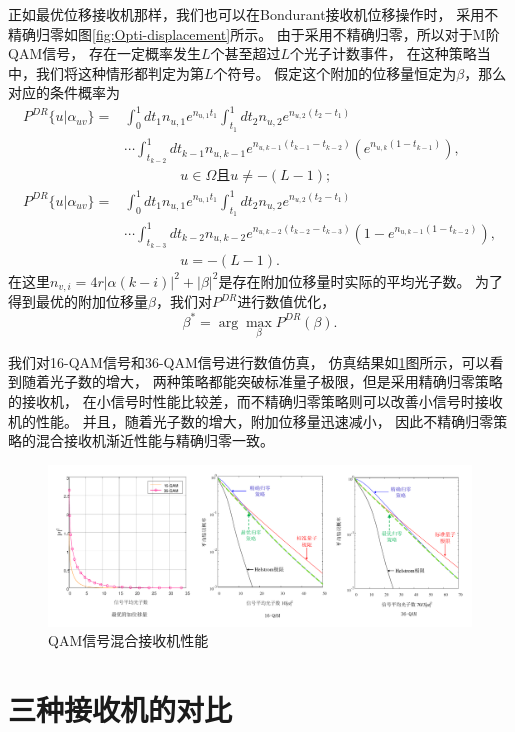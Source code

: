 正如最优位移接收机那样，我们也可以在Bondurant接收机位移操作时，
采用不精确归零如图\ref{fig:Opti-displacement}所示。
由于采用不精确归零，所以对于M阶QAM信号，
存在一定概率发生$L$个甚至超过$L$个光子计数事件，
在这种策略当中，我们将这种情形都判定为第$L$个符号。
假定这个附加的位移量恒定为$\beta$，那么对应的条件概率为
\begin{equation}
\begin{split}
P^{DR}\{u|\alpha_{uv}\} = & \int_0^1 dt_1 n_{u,1} e^{n_{u,1} t_1} \int_{t_1}^1 dt_2 n_{u,2} e^{n_{u,2} (t_2-t_1)} \\
                          & \cdots \int_{t_{k-2}}^1 dt_{k-1} n_{u,k-1} e^{n_{u,k-1} (t_{k-1}-t_{k-2})} \left( e^{n_{u,k} (1-t_{k-1})}\right), \\
                          & \qquad \qquad u \in \Omega \text{且} u \neq -(L-1);   \\
P^{DR}\{u|\alpha_{uv}\} = & \int_0^1 dt_1 n_{u,1} e^{n_{u,1} t_1} \int_{t_1}^1 dt_2 n_{u,2} e^{n_{u,2} (t_2-t_1)} \\
                          & \cdots \int_{t_{k-3}}^1 dt_{k-2} n_{u,k-2} e^{n_{u,k-2} (t_{k-2}-t_{k-3})} \left( 1 - e^{n_{u,k-1} (1-t_{k-2})}\right),  \\
                          & \qquad \qquad u = -(L-1).
\end{split}
\label{eq:DR-cond-p-2}
\end{equation}
在这里$n_{v,i} = 4r|\alpha(k-i)|^2 + |\beta|^2$是存在附加位移量时实际的平均光子数。
为了得到最优的附加位移量$\beta$，我们对$P^{DR}$进行数值优化，
\begin{equation}
\beta^* = \arg\max_{\beta} P^{DR}(\beta).
\end{equation}

我们对16-QAM信号和36-QAM信号进行数值仿真，
仿真结果如\ref{fig:QAM-Hybrid-error}图所示，可以看到随着光子数的增大，
两种策略都能突破标准量子极限，但是采用精确归零策略的接收机，
在小信号时性能比较差，而不精确归零策略则可以改善小信号时接收机的性能。
并且，随着光子数的增大，附加位移量迅速减小，
因此不精确归零策略的混合接收机渐近性能与精确归零一致。



\begin{figure}
\centering
  \includegraphics[width=\textwidth]{figures/chap3/QAM-Hybrid-error}
  \caption{QAM信号混合接收机性能}
  \label{fig:QAM-Hybrid-error}
\end{figure}



\section{三种接收机的对比}



